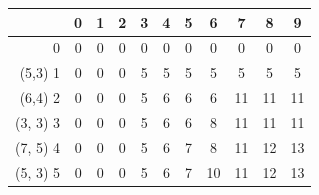 \documentclass[11pt]{article}
\theoremstyle{definition}
\theoremstyle{definition}
\theoremstyle{definition}
\begin{document}
\begin{tabular}{|r|c|c|c|c|c|c|c|c|c|c|}
\hline
           & 0 & 1 & 2 & 3 & 4 & 5 & 6 & 7 & 8 & 9\\ \hline
0         & 0 & 0 & 0 & 0 & 0 & 0 & 0 & 0 & 0 & 0 \\ \hline
(5,3) 1 & 0 & 0 & 0 & 5 & 5 & 5 & 5 & 5 & 5 & 5  \\ \hline
(6,4) 2 & 0 & 0 & 0 & 5 & 6 & 6 & 6 &11&11& 11\\ \hline
(3, 3) 3& 0 & 0 & 0 & 5 & 6 & 6 & 8 &11&11& 11 \\ \hline
(7, 5) 4& 0 & 0 & 0 & 5 & 6 & 7 & 8 &11 &12& 13\\ \hline
(5, 3) 5 &0 & 0 & 0 & 5 & 6 & 7 &10&11& 12& 13\\ \hline
\end{tabular}
\end{document}
